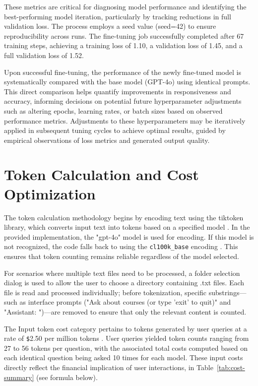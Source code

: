 \documentclass[12pt,oneside,openany]{report}
\begin{document}
These metrics are critical for diagnosing model performance and identifying the best-performing model iteration, particularly by tracking reductions in full validation loss. The process employs a seed value (seed=42) to ensure reproducibility across runs. The fine-tuning job successfully completed after 67 training steps, achieving a training loss of 1.10, a validation loss of 1.45, and a full validation loss of 1.52.

Upon successful fine-tuning, the performance of the newly fine-tuned model is systematically compared with the base model (GPT-4o) using identical prompts. This direct comparison helps quantify improvements in responsiveness and accuracy, informing decisions on potential future hyperparameter adjustments such as altering epochs, learning rates, or batch sizes based on observed performance metrics. Adjustments to these hyperparameters may be iteratively applied in subsequent tuning cycles to achieve optimal results, guided by empirical observations of loss metrics and generated output quality.


\section{Token Calculation and Cost Optimization}

The token calculation methodology begins by encoding text using the tiktoken library, which converts input text into tokens based on a specified model \cite{tiktoken033}. In the provided implementation, the "gpt-4o" model is used for encoding. If this model is not recognized, the code falls back to using the \verb|cl100k_base| encoding \cite{tiktoken033}. This ensures that token counting remains reliable regardless of the model selected.

For scenarios where multiple text files need to be processed, a folder selection dialog is used to allow the user to choose a directory containing .txt files. Each file is read and processed individually; before tokenization, specific substrings—such as interface prompts ("Ask about courses (or type 'exit' to quit)" and "Assistant: ")—are removed to ensure that only the relevant content is counted.

The Input token cost category pertains to tokens generated by user queries at a rate of \verb|$|2.50 per million tokens \cite{openaiAPIPricing}. User queries yielded token counts ranging from 27 to 56 tokens per question, with the associated total costs computed based on each identical question being asked 10 times for each model. These input costs directly reflect the financial implication of user interactions, in Table~\ref{tab:cost-summary}  (see formula below).
\end{document}
